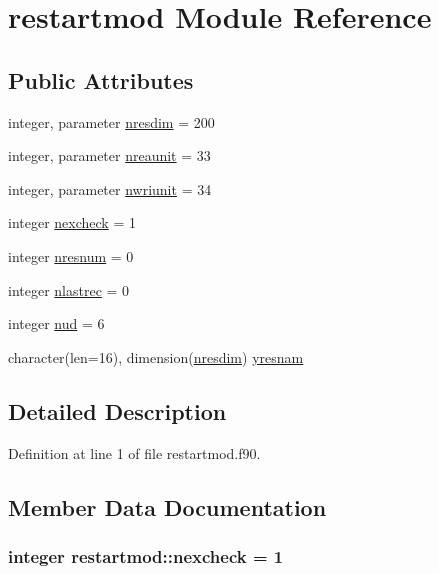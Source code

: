 \hypertarget{classrestartmod}{
\section{restartmod \-Module \-Reference}
\label{classrestartmod}
}
\subsection*{\-Public \-Attributes}
\begin{DoxyCompactItemize}
\item 
integer, parameter \hyperlink{classrestartmod_a119672601ee8ad1243340351dc2faf68}{nresdim} = 200
\item 
integer, parameter \hyperlink{classrestartmod_a52e198eada6191afcaadc69e5e5095bd}{nreaunit} = 33
\item 
integer, parameter \hyperlink{classrestartmod_af19c3e29c219ca79f3ab6b6b18df1f41}{nwriunit} = 34
\item 
integer \hyperlink{classrestartmod_a15d8821292e2f6f6b26576d57ca25af5}{nexcheck} = 1
\item 
integer \hyperlink{classrestartmod_a45dcb9f30f8dfa87fcbf479bf0faee46}{nresnum} = 0
\item 
integer \hyperlink{classrestartmod_a77d97f720a628d5e57e7589cd1dbc7c8}{nlastrec} = 0
\item 
integer \hyperlink{classrestartmod_a8a3daeed29c348b61636e5e6994b9a28}{nud} = 6
\item 
character(len=16), dimension(\hyperlink{classrestartmod_a119672601ee8ad1243340351dc2faf68}{nresdim}) \hyperlink{classrestartmod_a7a18509625928d4fe3a5d1f5033589ab}{yresnam}
\end{DoxyCompactItemize}


\subsection{\-Detailed \-Description}


\-Definition at line 1 of file restartmod.\-f90.



\subsection{\-Member \-Data \-Documentation}
\hypertarget{classrestartmod_a15d8821292e2f6f6b26576d57ca25af5}{
\subsubsection[{nexcheck}]{\setlength{\rightskip}{0pt plus 5cm}integer {\bf restartmod\-::nexcheck} = 1}}
\label{classrestartmod_a15d8821292e2f6f6b26576d57ca25af5}


